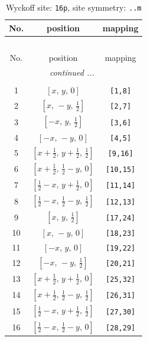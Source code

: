 \documentclass[fleqn,8pt]{jsarticle}
\begin{document}
\renewcommand{\arraystretch}{1.2}
\begin{longtable}{ccc}
\caption{Wyckoff site: {\tt 16p}, site symmetry: {\tt ..m}}
 \\
 \hline \hline
No. & position & mapping \\ \hline \endfirsthead

\multicolumn{2}{l}{\tablename\ \thetable{}} \\
 \hline \hline
No. & position & mapping \\ \hline \endhead

 \hline \hline
\multicolumn{2}{r}{\footnotesize\it continued ...} \\ \endfoot

 \hline \hline
\multicolumn{2}{r}{} \\ \endlastfoot

1 & $\left[ x,\, y,\, 0 \right]$ & {\tt [1,8]} \\ \hline
2 & $\left[ x,\, - y,\, \frac{1}{2} \right]$ & {\tt [2,7]} \\ \hline
3 & $\left[ - x,\, y,\, \frac{1}{2} \right]$ & {\tt [3,6]} \\ \hline
4 & $\left[ - x,\, - y,\, 0 \right]$ & {\tt [4,5]} \\ \hline
5 & $\left[ x + \frac{1}{2},\, y + \frac{1}{2},\, \frac{1}{2} \right]$ & {\tt [9,16]} \\ \hline
6 & $\left[ x + \frac{1}{2},\, \frac{1}{2} - y,\, 0 \right]$ & {\tt [10,15]} \\ \hline
7 & $\left[ \frac{1}{2} - x,\, y + \frac{1}{2},\, 0 \right]$ & {\tt [11,14]} \\ \hline
8 & $\left[ \frac{1}{2} - x,\, \frac{1}{2} - y,\, \frac{1}{2} \right]$ & {\tt [12,13]} \\ \hline
9 & $\left[ x,\, y,\, \frac{1}{2} \right]$ & {\tt [17,24]} \\ \hline
10 & $\left[ x,\, - y,\, 0 \right]$ & {\tt [18,23]} \\ \hline
11 & $\left[ - x,\, y,\, 0 \right]$ & {\tt [19,22]} \\ \hline
12 & $\left[ - x,\, - y,\, \frac{1}{2} \right]$ & {\tt [20,21]} \\ \hline
13 & $\left[ x + \frac{1}{2},\, y + \frac{1}{2},\, 0 \right]$ & {\tt [25,32]} \\ \hline
14 & $\left[ x + \frac{1}{2},\, \frac{1}{2} - y,\, \frac{1}{2} \right]$ & {\tt [26,31]} \\ \hline
15 & $\left[ \frac{1}{2} - x,\, y + \frac{1}{2},\, \frac{1}{2} \right]$ & {\tt [27,30]} \\ \hline
16 & $\left[ \frac{1}{2} - x,\, \frac{1}{2} - y,\, 0 \right]$ & {\tt [28,29]} \\
\end{longtable}
\end{document}

